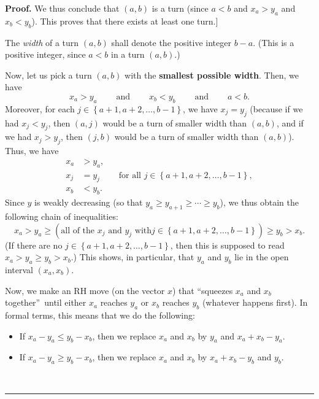 \documentclass[numbers=enddot,12pt,final,onecolumn,notitlepage]{scrartcl}%
\numberwithin{exer}{subsection}
\theoremstyle{definition}
\newenvironment{proof}[1][Proof]{\noindent\textbf{#1.} }{\ \rule{0.5em}{0.5em}}
\begin{document}
\begin{proof}
We thus conclude that $\left(  a,b\right)  $ is a turn (since $a<b$ and
$x_{a}>y_{a}$ and $x_{b}<y_{b}$). This proves that there exists at least one
turn.] \medskip

The \emph{width} of a turn $\left(  a,b\right)  $ shall denote the positive
integer $b-a$. (This is a positive integer, since $a<b$ in a turn $\left(
a,b\right)  $.)

Now, let us pick a turn $\left(  a,b\right)  $ with the \textbf{smallest
possible width}. Then, we have%
\[
x_{a}>y_{a}\ \ \ \ \ \ \ \ \ \ \text{and}\ \ \ \ \ \ \ \ \ \ x_{b}%
<y_{b}\ \ \ \ \ \ \ \ \ \ \text{and}\ \ \ \ \ \ \ \ \ \ a<b.
\]
Moreover, for each $j\in\left\{  a+1,a+2,\ldots,b-1\right\}  $, we have
$x_{j}=y_{j}$ (because if we had $x_{j}<y_{j}$, then $\left(  a,j\right)  $
would be a turn of smaller width than $\left(  a,b\right)  $, and if we had
$x_{j}>y_{j}$, then $\left(  j,b\right)  $ would be a turn of smaller width
than $\left(  a,b\right)  $). Thus, we have
\begin{align*}
x_{a}  &  >y_{a},\\
x_{j}  &  =y_{j}\ \ \ \ \ \ \ \ \ \ \text{for all }j\in\left\{  a+1,a+2,\ldots
,b-1\right\}  ,\\
x_{b}  &  <y_{b}.
\end{align*}
Since $y$ is weakly decreasing (so that $y_{a}\geq y_{a+1}\geq\cdots\geq
y_{b}$), we thus obtain the following chain of inequalities:%
\[
x_{a}>y_{a}\geq\left(  \text{all of the }x_{j}\text{ and }y_{j}\text{ with
}j\in\left\{  a+1,a+2,\ldots,b-1\right\}  \right)  \geq y_{b}>x_{b}.
\]
(If there are no $j\in\left\{  a+1,a+2,\ldots,b-1\right\}  $, then this is
supposed to read $x_{a}>y_{a}\geq y_{b}>x_{b}$.) This shows, in particular,
that $y_{a}$ and $y_{b}$ lie in the open interval $\left(  x_{a},x_{b}\right)
$.

Now, we make an RH move (on the vector $x$) that \textquotedblleft squeezes
$x_{a}$ and $x_{b}$ together\textquotedblright\ until either $x_{a}$ reaches
$y_{a}$ or $x_{b}$ reaches $y_{b}$ (whatever happens first). In formal terms,
this means that we do the following:

\begin{itemize}
\item If $x_{a}-y_{a}\leq y_{b}-x_{b}$, then we replace $x_{a}$ and $x_{b}$ by
$y_{a}$ and $x_{a}+x_{b}-y_{a}$.

\item If $x_{a}-y_{a}\geq y_{b}-x_{b}$, then we replace $x_{a}$ and $x_{b}$ by
$x_{a}+x_{b}-y_{b}$ and $y_{b}$.
\end{itemize}


\end{proof}
\end{document}

